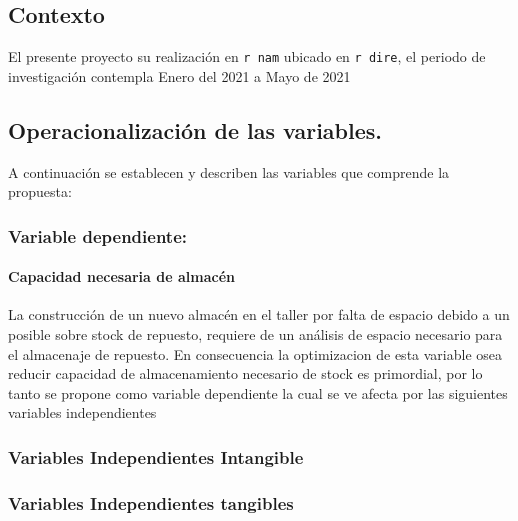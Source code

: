 \documentclass[11pt]{article}
\begin{document}
\hypertarget{contexto}{%
\subsection{Contexto}\label{contexto}}

El presente proyecto su realización en \texttt{r\ nam} ubicado en
\texttt{r\ dire}, el periodo de investigación contempla Enero del 2021 a
Mayo de 2021

\hypertarget{operacionalizaciuxf3n-de-las-variables.}{%
\subsection{Operacionalización de las
variables.}\label{operacionalizaciuxf3n-de-las-variables.}}

A continuación se establecen y describen las variables que comprende la
propuesta:

\hypertarget{variable-dependiente}{%
\subsubsection{Variable dependiente:}\label{variable-dependiente}}

\hypertarget{capacidad-necesaria-de-almacuxe9n}{%
\paragraph{Capacidad necesaria de
almacén}\label{capacidad-necesaria-de-almacuxe9n}}

La construcción de un nuevo almacén en el taller por falta de espacio
debido a un posible sobre stock de repuesto, requiere de un análisis de
espacio necesario para el almacenaje de repuesto. En consecuencia la
optimizacion de esta variable osea reducir capacidad de almacenamiento
necesario de stock es primordial, por lo tanto se propone como variable
dependiente la cual se ve afecta por las siguientes variables
independientes

\hypertarget{variables-independientes-intangible-1}{%
\subsubsection{Variables Independientes
Intangible}\label{variables-independientes-intangible-1}}

\hypertarget{variables-independientes-tangibles-1}{%
\subsubsection{Variables Independientes
tangibles}\label{variables-independientes-tangibles-1}}
\end{document}
